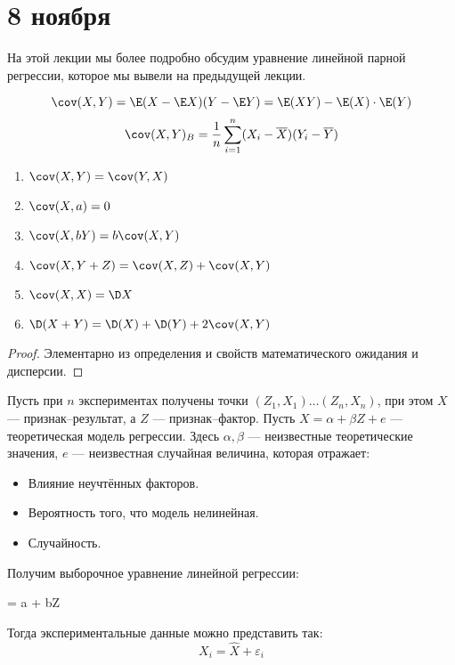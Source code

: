 \chapter{8 ноября}

На этой лекции мы более подробно обсудим уравнение линейной парной регрессии, которое мы вывели на предыдущей лекции.

\begin{definition}
    \[\cov(X, Y) = \E (X - \E X)(Y - \E Y) = \E(XY) - \E(X) \cdot \E(Y)\]
    \[\cov(X, Y)_B = \frac{1}{n} \sum_{i=1}^{n} (X_i - \overline{X})(Y_i - \overline{Y})\]
\end{definition}
\begin{prop}\itemfix
    \begin{enumerate}
        \item \(\cov(X, Y) = \cov(Y, X)\)
        \item \(\cov(X, a) = 0\)
        \item \(\cov(X, bY) = b \cov(X, Y)\)
        \item \(\cov(X, Y + Z) = \cov(X, Z) + \cov(X, Y)\)
        \item \(\cov(X, X) = \D X\)
        \item \(\D(X + Y) = \D(X) + \D(Y) + 2 \cov(X, Y)\)
    \end{enumerate}
\end{prop}
\begin{proof}
    Элементарно из определения и свойств математического ожидания и дисперсии.
\end{proof}

Пусть при \(n\) экспериментах получены точки \((Z_1, X_1) \dots (Z_n, X_n)\), при этом \(X\) --- признак--результат, а \(Z\) --- признак--фактор. Пусть \(X = \alpha + \beta Z + e\) --- теоретическая модель регрессии. Здесь \(\alpha, \beta\) --- неизвестные теоретические значения, \(e\) --- неизвестная случайная величина, которая отражает:
\begin{itemize}
    \item Влияние неучтённых факторов.
    \item Вероятность того, что модель нелинейная.
    \item Случайность.
\end{itemize}

Получим выборочное уравнение линейной регрессии:
\begin{myemph}
     = a + bZ
\end{myemph}

Тогда экспериментальные данные можно представить так:
\[X_i = \hat{X} + \varepsilon_i\]

